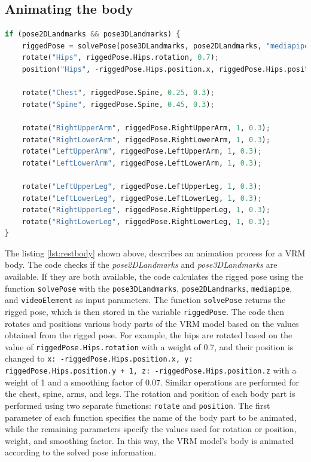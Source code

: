 \subsection{Animating the body}
\begin{lstlisting}[language=Python,caption=Animating the rest of the body,label=lst:restbody]
    if (pose2DLandmarks && pose3DLandmarks) {
    riggedPose = solvePose(pose3DLandmarks, pose2DLandmarks, "mediapipe", videoElement);
    rotate("Hips", riggedPose.Hips.rotation, 0.7);
    position("Hips", -riggedPose.Hips.position.x, riggedPose.Hips.position.y + 1, -riggedPose.Hips.position.z, 1, 0.07);

    rotate("Chest", riggedPose.Spine, 0.25, 0.3);
    rotate("Spine", riggedPose.Spine, 0.45, 0.3);

    rotate("RightUpperArm", riggedPose.RightUpperArm, 1, 0.3);
    rotate("RightLowerArm", riggedPose.RightLowerArm, 1, 0.3);
    rotate("LeftUpperArm", riggedPose.LeftUpperArm, 1, 0.3);
    rotate("LeftLowerArm", riggedPose.LeftLowerArm, 1, 0.3);

    rotate("LeftUpperLeg", riggedPose.LeftUpperLeg, 1, 0.3);
    rotate("LeftLowerLeg", riggedPose.LeftLowerLeg, 1, 0.3);
    rotate("RightUpperLeg", riggedPose.RightUpperLeg, 1, 0.3);
    rotate("RightLowerLeg", riggedPose.RightLowerLeg, 1, 0.3);
}

\end{lstlisting}
The listing \ref{lst:restbody} shown above, describes an animation process for a VRM body. 
The code checks if the \emph{pose2DLandmarks} and \emph{pose3DLandmarks} are available. If they are both available, 
the code calculates the rigged pose using the function \texttt{solvePose} with the \texttt{pose3DLandmarks}, \texttt{pose2DLandmarks}, 
\texttt{mediapipe}, and \texttt{videoElement} as input parameters. The function \texttt{solvePose} returns the rigged pose, which 
is then stored in the variable \texttt{riggedPose}.
The code then rotates and positions various body parts of the VRM model based on the values obtained from the 
rigged pose. For example, the hips are rotated based on the value of \texttt{riggedPose.Hips.rotation} with a weight 
of 0.7, and their position is changed to \texttt{x: -riggedPose.Hips.position.x, y: riggedPose.Hips.position.y + 1, z: 
-riggedPose.Hips.position.z} with a weight of 1 and a smoothing factor of 0.07. Similar operations are performed 
for the chest, spine, arms, and legs.
The rotation and position of each body part is performed using two separate functions: \texttt{rotate} and 
\texttt{position}. The first parameter of each function specifies the name of the body part to be animated, 
while the remaining parameters specify the values used for rotation or position, weight, and smoothing factor.
In this way, the VRM model's body is animated according to the solved pose information.

